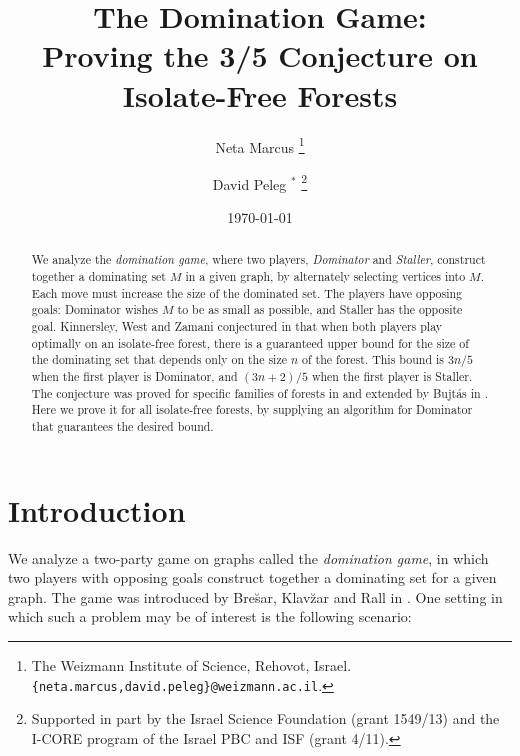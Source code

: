 \documentclass[11pt]{article}
\theoremstyle{definition}
\begin{document}
\onehalfspacing

\title{The Domination Game: \\
Proving the 3/5 Conjecture on Isolate-Free Forests}
\date{\today}
\author{Neta Marcus
\thanks{The Weizmann Institute of Science, Rehovot, Israel.
{\tt \{neta.marcus,david.peleg\}@weizmann.ac.il}.}
\and
David Peleg $^*$ 
\thanks{Supported in part by the Israel Science Foundation (grant 1549/13)
and the I-CORE program of the Israel PBC and ISF (grant 4/11).}
}
\maketitle

\begin{abstract}
We analyze the \emph{domination game}, where two players, {\em Dominator} and {\em Staller}, construct together a dominating set $M$ in a given graph, by alternately selecting vertices into $M$. Each move must increase the size of the dominated set. The players have opposing goals: Dominator wishes $M$ to be as small as possible, and Staller has the opposite goal. 
Kinnersley, West and Zamani conjectured in \cite{kinnersley2013extremal} that when both players play optimally on an isolate-free forest, there is a guaranteed upper bound for the size of the dominating set that depends only on the size $n$ of the forest. This bound is $3n/5$ when the first player is Dominator, and $(3n+2)/5$ when the first player is Staller. 
The conjecture was proved for specific families of forests in \cite{kinnersley2013extremal} and extended by Bujt\'as in \cite{bujtas2015domination}. 
Here we prove it for all isolate-free forests, by supplying an algorithm for Dominator that guarantees the desired bound.
\end{abstract}


\section{Introduction}
\label{chapter:intro}

We analyze a two-party game on graphs called the \emph{domination game}, in which two players with opposing goals construct together a dominating set for a given graph.
The game was introduced by Bre\u{s}ar, Klav\u{z}ar and Rall in \cite{brevsar2010domination}.
One setting in which such a problem may be of interest is the following scenario:
\end{document}
